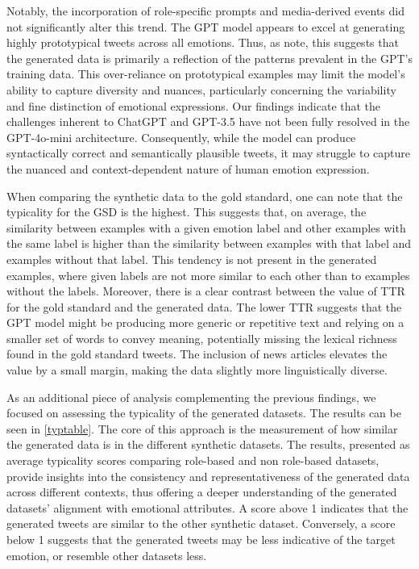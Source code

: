 \documentclass[manuscript]{clv3}
\begin{document}
Notably, the incorporation of role-specific prompts and media-derived events did not significantly alter this trend. The GPT model appears to excel at generating highly prototypical tweets across all emotions. Thus, as \citet{van-nooten-daelemans-2023-improving} note, this suggests that the generated data is primarily a reflection of the patterns prevalent in the GPT's training data. This over-reliance on prototypical examples may limit the model's ability to capture diversity and nuances, particularly concerning the variability and fine distinction of emotional expressions. Our findings indicate that the challenges inherent to ChatGPT and GPT-3.5 have not been fully resolved in the GPT-4o-mini architecture. Consequently, while the model can produce syntactically correct and semantically plausible tweets, it may struggle to capture the nuanced and context-dependent nature of human emotion expression. 

When comparing the synthetic data to the gold standard, one can note that the typicality for the GSD is the highest. This suggests that, on average, the similarity between examples with a given emotion label and other examples with the same label is higher than the similarity between examples with that label and examples without that label. This tendency is not present in the generated examples, where given labels are not more similar to each other than to examples without the labels. Moreover, there is a clear contrast between the value of TTR for the gold standard and the generated data. The lower TTR suggests that the GPT model might be producing more generic or repetitive text and relying on a smaller set of words to convey meaning, potentially missing the lexical richness found in the gold standard tweets. The inclusion of news articles elevates the value by a small margin, making the data slightly more linguistically diverse. 

As an additional piece of analysis complementing the previous findings, we focused on assessing the typicality of the generated datasets. The results can be seen in \autoref{typtable}. The core of this approach is the measurement of how similar the generated data is in the different synthetic datasets. The results, presented as average typicality scores comparing role-based and non role-based datasets, provide insights into the consistency and representativeness of the generated data across different contexts, thus offering a deeper understanding of the generated datasets' alignment with emotional attributes. A score above 1 indicates that the generated tweets are similar to the other synthetic dataset. Conversely, a score below 1 suggests that the generated tweets may be less indicative of the target emotion, or resemble other datasets less.
\end{document}

